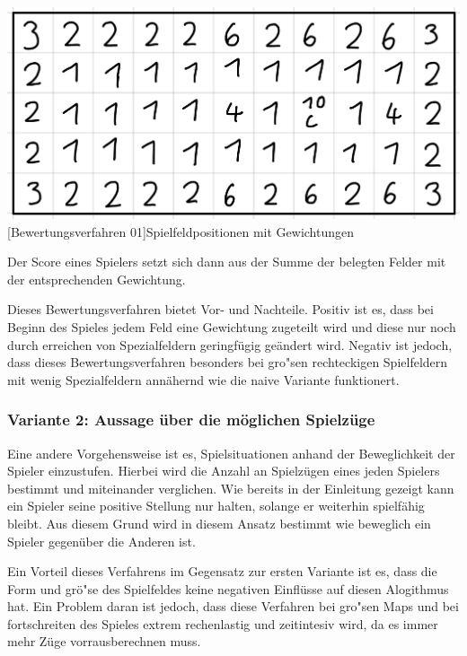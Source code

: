 \vspace{1em}
\begin{minipage}{\linewidth}
    \centering
    \includegraphics[width=0.5\linewidth]{pics/bewertung}
    [Bewertungsverfahren 01]{Spielfeldpositionen mit Gewichtungen}
    \label{fig:bewertungsverfahren01}
\end{minipage}

Der Score eines Spielers setzt sich dann aus der Summe der belegten Felder mit der entsprechenden Gewichtung.

Dieses Bewertungsverfahren bietet Vor- und Nachteile.
Positiv ist es, dass bei Beginn des Spieles jedem Feld eine Gewichtung zugeteilt wird und diese nur noch durch erreichen von Spezialfeldern geringf\"ugig ge\"andert wird.
Negativ ist jedoch, dass dieses Bewertungsverfahren besonders bei gro"sen rechteckigen Spielfeldern mit wenig Spezialfeldern ann\"ahernd wie die naive Variante funktionert.

\subsubsection{Variante 2: Aussage über die möglichen Spielzüge}
Eine andere Vorgehensweise ist es, Spielsituationen anhand der Beweglichkeit der Spieler einzustufen.
Hierbei wird die Anzahl an Spielz\"ugen eines jeden Spielers bestimmt und miteinander verglichen.
Wie bereits in der Einleitung gezeigt kann ein Spieler seine positive Stellung nur halten, solange er weiterhin spielf\"ahig bleibt.
Aus diesem Grund wird in diesem Ansatz bestimmt wie beweglich ein Spieler gegen\"uber die Anderen ist.

Ein Vorteil dieses Verfahrens im Gegensatz zur ersten Variante ist es, dass die Form und gr\"o"se des Spielfeldes keine negativen Einfl\"usse auf diesen Alogithmus hat.
Ein Problem daran ist jedoch, dass diese Verfahren bei gro"sen Maps und bei fortschreiten des Spieles extrem rechenlastig und zeitintesiv wird, da es immer mehr Z\"uge vorrausberechnen muss.


\bigskip
\newpage